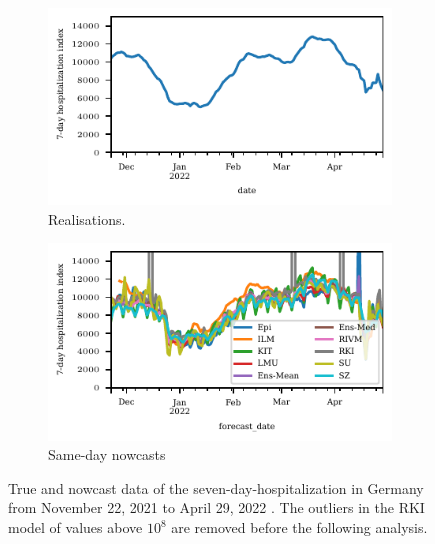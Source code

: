 \begin{figure}
    \centering
    \begin{subfigure}[t]{0.48\textwidth}
    \includegraphics{plots/covid_nowcast/00_true_data.pdf}
    \caption{Realisations.}
    \label{fig:app-covid-true}
    \end{subfigure}\hfill
    \begin{subfigure}[t]{0.48\textwidth}
    \includegraphics{plots/covid_nowcast/00_nowcast_data.pdf}
    \caption{Same-day nowcasts}
    \label{fig:app-covid-nowcast}
        \end{subfigure}
    \caption{True and nowcast data of the seven-day-hospitalization in Germany from November 22, 2021 to April 29, 2022 \parencite{ChairOfEconometricsAndStatisticsAtKarlsruheInstituteOfTechnology2024}.
    The outliers in the RKI model of values above $10^8$ are removed before the following analysis.}
    \label{fig:app-covid-true-nowcast}
\end{figure}


